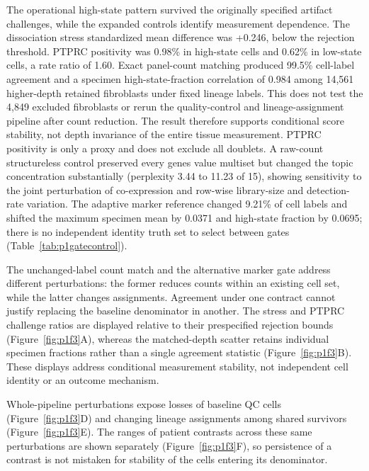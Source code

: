 The operational high-state pattern survived the originally specified artifact challenges, while the expanded controls identify measurement dependence. The dissociation stress standardized mean difference was +0.246, below the rejection threshold. PTPRC positivity was 0.98\% in high-state cells and 0.62\% in low-state cells, a rate ratio of 1.60. Exact panel-count matching produced 99.5\% cell-label agreement and a specimen high-state-fraction correlation of 0.984 among 14,561 higher-depth retained fibroblasts under fixed lineage labels. This does not test the 4,849 excluded fibroblasts or rerun the quality-control and lineage-assignment pipeline after count reduction. The result therefore supports conditional score stability, not depth invariance of the entire tissue measurement. PTPRC positivity is only a proxy and does not exclude all doublets. A raw-count structureless control preserved every gene\textquotesingle{}s value multiset but changed the topic concentration substantially (perplexity 3.44 to 11.23 of 15), showing sensitivity to the joint perturbation of co-expression and row-wise library-size and detection-rate variation. The adaptive marker reference changed 9.21\% of cell labels and shifted the maximum specimen mean by 0.0371 and high-state fraction by 0.0695; there is no independent identity truth set to select between gates (Table~\ref{tab:p1gatecontrol}).

The unchanged-label count match and the alternative marker gate address different perturbations: the former reduces counts within an existing cell set, while the latter changes assignments. Agreement under one contract cannot justify replacing the baseline denominator in another. 
\FloatBarrier
The stress and PTPRC challenge ratios are displayed relative to their prespecified rejection bounds (Figure~\ref{fig:p1f3}A\label{call:p1f3}), whereas the matched-depth scatter retains individual specimen fractions rather than a single agreement statistic (Figure~\ref{fig:p1f3}B). These displays address conditional measurement stability, not independent cell identity or an outcome mechanism.



Whole-pipeline perturbations expose losses of baseline QC cells (Figure~\ref{fig:p1f3}D) and changing lineage assignments among shared survivors (Figure~\ref{fig:p1f3}E). The ranges of patient contrasts across these same perturbations are shown separately (Figure~\ref{fig:p1f3}F), so persistence of a contrast is not mistaken for stability of the cells entering its denominator.

